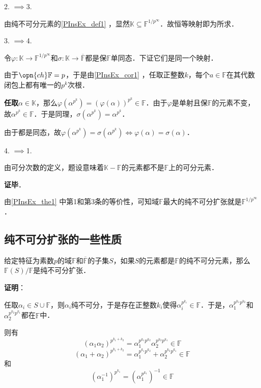 2. $\implies$3. 

由纯不可分元素的\autoref{PInsEx_def1} ，显然$\mathbb{K}\subseteq\mathbb{F}^{1/p^\infty}$．故恒等映射即为所求．

3. $\implies$4. 

令$\varphi:\mathbb{K}\to\mathbb{F}^{1/p^\infty}$和$\sigma:\mathbb{K}\to\overline{\mathbb{F}}$都是保$\mathbb{F}$单同态．下证它们是同一个映射．

由于$\opn{ch}\mathbb{F}=p$，于是由\autoref{PInsEx_cor1} ，任取正整数$k$，每个$a\in\mathbb{F}$在其代数闭包上都有唯一的$p^k$次根．

\textbf{任取}$\alpha\in\mathbb{K}$，那么$\varphi(\alpha^{p^k})=(\varphi(\alpha))^{p^k}\in\mathbb{F}$．由于$\varphi$是单射且保$\mathbb{F}$的元素不变，故$\alpha^{p^k}\in\mathbb{F}$．于是同理，$\sigma(\alpha^{p^k})=\alpha^{p^k}$．

由于都是同态，故$\varphi(\alpha^{p^k})=\sigma(\alpha^{p^k})\iff \varphi(\alpha)=\sigma(\alpha)$．

4. $\implies$1. 

由可分次数的定义，题设意味着$\mathbb{K}-\mathbb{F}$的元素都不是$\mathbb{F}$上的可分元素．


\textbf{证毕}．

由\autoref{PInsEx_the1} 中第1和第3条的等价性，可知域$\mathbb{F}$最大的纯不可分扩张就是$\mathbb{F}^{1/p^\infty}$．





\subsection{纯不可分扩张的一些性质}


\begin{theorem}{}
给定特征为素数$p$的域$\mathbb{F}$和$\overline{\mathbb{F}}$的子集$S$，如果$S$的元素都是$\mathbb{F}$的纯不可分元素，那么$\mathbb{F}(S)/\mathbb{F}$是纯不可分扩张．
\end{theorem}

\textbf{证明}：

任取$\alpha_i\in S\cup\mathbb{F}$，则$\alpha_i$纯不可分，于是存在正整数$k_i$使得$\alpha_i^{p^{k_i}}\in\mathbb{F}$．于是，$\alpha_1^{p^{k_1}p^{k_2}}$和$\alpha_2^{p^{k_2}p^{k_1}}$都在$\mathbb{F}$中．

则有
\begin{equation}\label{PInsEx_eq1}
(\alpha_1\alpha_2)^{p^{k_1+k_2}}=\alpha_1^{p^{k_1}p^{k_2}}\alpha_2^{p^{k_2}p^{k_1}}\in\mathbb{F}
\end{equation}
\begin{equation}\label{PInsEx_eq2}
(\alpha_1+\alpha_2)^{p^{k_1+k_2}}=\alpha_1^{p^{k_1}p^{k_2}}+\alpha_2^{p^{k_2}p^{k_1}}\in\mathbb{F}
\end{equation}
和
\begin{equation}\label{PInsEx_eq3}
(\alpha_1^{-1})^{p^{k_1}} = (\alpha_1^{p^{k_1}})^{-1} \in\mathbb{F}
\end{equation}

